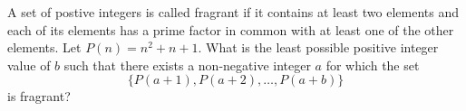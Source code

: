 A set of postive integers is called fragrant
 if it contains at least two elements and each of its elements has a 
prime factor in common with at least one of the other elements.  Let $P(n)=n^2+n+1$.  What is the least possible positive integer value of $b$ such that there exists a non-negative integer $a$ for which the set $$\{P(a+1),P(a+2),\ldots,P(a+b)\}$$is fragrant?
